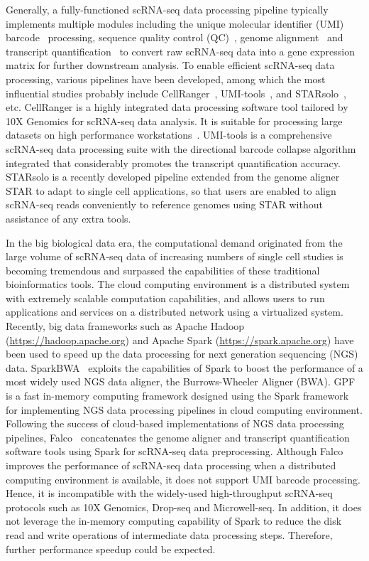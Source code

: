 \documentclass[conference]{IEEEtran}
\begin{document}
Generally, a fully-functioned scRNA-seq data processing pipeline typically implements multiple modules including the unique molecular identifier (UMI) barcode~\cite{Smith2017UMItools} processing, sequence quality control (QC)~\cite{schmieder2011quality}, genome alignment~\cite{Dobin2013STAR,Kim2015HISAT} and transcript quantification~\cite{Parekh2018zUMIs} to convert raw scRNA-seq data into a gene expression matrix for further downstream analysis. 
To enable efficient scRNA-seq data processing, various pipelines have been developed, among which the most influential studies probably include CellRanger~\cite{Zheng2017Massively}, UMI-tools~\cite{Smith2017UMItools}, and STARsolo~\cite{Blibaum2019STARsolo}, etc. 
CellRanger is a highly integrated data processing software tool tailored by 10X Genomics for scRNA-seq data analysis.
It is suitable for processing large datasets on high performance workstations~\cite{Gao2020Comparison}. 
UMI-tools is a comprehensive scRNA-seq data processing suite with the directional barcode collapse algorithm integrated that considerably promotes the transcript quantification accuracy.
STARsolo is a recently developed pipeline extended from the genome aligner STAR to adapt to single cell applications, so that users are enabled to align scRNA-seq reads conveniently to reference genomes using STAR without assistance of any extra tools.

In the big biological data era, 
the computational demand originated from the large volume of scRNA-seq data of increasing numbers of single cell studies is becoming tremendous and surpassed the capabilities of these traditional bioinformatics tools. 
The cloud computing environment is a distributed system with extremely scalable computation capabilities, and allows users to run applications and services on a distributed network using a virtualized system. 
Recently, big data frameworks such as Apache Hadoop (\url{https://hadoop.apache.org}) and Apache Spark (\url{https://spark.apache.org}) have been used to speed up the data processing for next generation sequencing (NGS) data. 
SparkBWA~\cite{Abun2016SparkBWA} exploits the capabilities of Spark to boost the performance of a most widely used NGS data aligner, the Burrows-Wheeler Aligner (BWA). 
GPF~\cite{Li2018Highperformance} is a fast in-memory computing framework designed using the Spark framework for implementing NGS data processing pipelines in cloud computing environment. 
Following the success of cloud-based implementations of NGS data processing pipelines, Falco~\cite{Yang2017Falco} concatenates the genome aligner and transcript quantification software tools using Spark for scRNA-seq data preprocessing.
Although Falco improves the performance of scRNA-seq data processing when a distributed computing environment is available, it does not support UMI barcode processing. Hence, it is incompatible with the widely-used high-throughput scRNA-seq protocols such as 10X Genomics, Drop-seq and Microwell-seq. In addition, it does not leverage the in-memory computing capability of Spark to reduce the disk read and write operations of intermediate data processing steps. Therefore, further performance speedup could be expected. 
\end{document}
